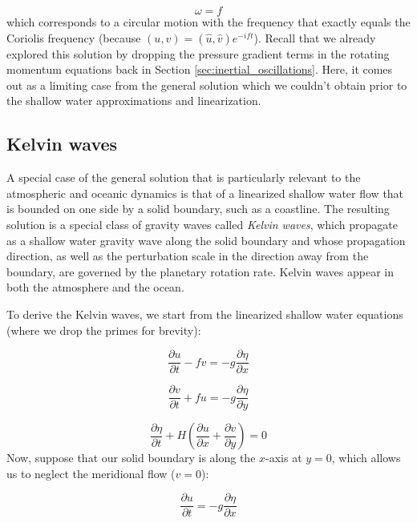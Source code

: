 \documentclass[12pt]{article}
\numberwithin{equation}{section}
\numberwithin{figure}{section}
\numberwithin{table}{section}
\begin{document}
\begin{equation}
  \omega = f
\end{equation}
which corresponds to a circular motion with the frequency that exactly equals
the Coriolis frequency (because $(u, v) = (\widehat{u}, \widehat{v}) e^{- i f t}$).
Recall that we already explored this solution by dropping the pressure gradient
terms in the rotating momentum equations back in Section
\ref{sec:inertial_oscillations}.
Here, it comes out as a limiting case from the general solution which we
couldn't obtain prior to the shallow water approximations and linearization.

\subsection{Kelvin waves}

A special case of the general solution that is particularly relevant to the
atmospheric and oceanic dynamics is that of a linearized shallow water flow
that is bounded on one side by a solid boundary, such as a coastline.
The resulting solution is a special class of gravity waves called
\textit{Kelvin waves}, which propagate as a shallow water
gravity wave along the solid boundary and whose propagation direction, as well
as the perturbation scale in the direction away from the boundary, are governed
by the planetary rotation rate.
Kelvin waves appear in both the atmosphere and the ocean.

To derive the Kelvin waves, we start from the linearized shallow water equations
(where we drop the primes for brevity):

\begin{equation}
  \frac{\partial u}{\partial t} - f v = - g \frac{\partial \eta}{\partial x}
\end{equation}

\begin{equation}
  \frac{\partial v}{\partial t} + f u = - g \frac{\partial \eta}{\partial y}
\end{equation}

\begin{equation}
  \frac{\partial \eta}{\partial t} + H \left( \frac{\partial u}{\partial x} + \frac{\partial v}{\partial y} \right) = 0
\end{equation}
Now, suppose that our solid boundary is along the $x$-axis at $y = 0$, which
allows us to neglect the meridional flow ($v=0$):

\begin{equation}
  \frac{\partial u}{\partial t} = - g \frac{\partial \eta}{\partial x}
  \label{eq:kelvin_u}
\end{equation}
\end{document}
